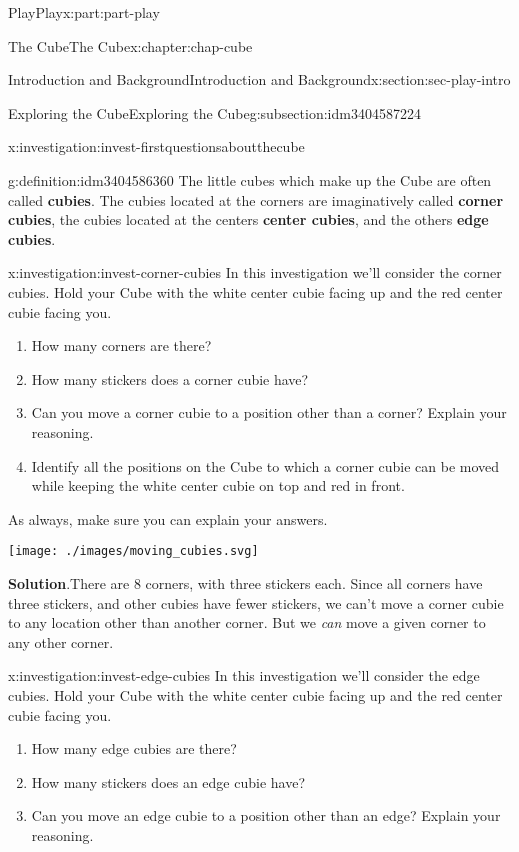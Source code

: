 \documentclass[oneside,10pt,]{book}
\newcommand{\blocktitlefont}{\relax}
\newcommand{\terminology}[1]{\textbf{#1}}
\numberwithin{equation}{section}
\begin{document}
\begin{partptx}{Play}{}{Play}{}{}{x:part:part-play}
\begin{chapterptx}{The Cube}{}{The Cube}{}{}{x:chapter:chap-cube}
\begin{sectionptx}{Introduction and Background}{}{Introduction and Background}{}{}{x:section:sec-play-intro}
\begin{subsectionptx}{Exploring the Cube}{}{Exploring the Cube}{}{}{g:subsection:idm3404587224}
\begin{investigation}{}{x:investigation:invest-firstquestionsaboutthecube}
\end{investigation}%
\begin{definition}{}{g:definition:idm3404586360}%
%
%
%
%
The little cubes which make up the Cube are often called \terminology{cubies}. The cubies located at the corners are imaginatively called \terminology{corner cubies}, the cubies located at the centers \terminology{center cubies}, and the others \terminology{edge cubies}.%
\end{definition}
\begin{investigation}{}{x:investigation:invest-corner-cubies}%
In this investigation we'll consider the corner cubies. Hold your Cube with the white center cubie facing up and the red center cubie facing you.%
\begin{enumerate}
\item{}How many corners are there?%
\item{}How many stickers does a corner cubie have?%
\item{}Can you move a corner cubie to a position other than a corner? Explain your reasoning.%
\item{}Identify all the positions on the Cube to which a corner cubie can be moved while keeping the white center cubie on top and red in front.%
\end{enumerate}
As always, make sure you can explain your answers.%
\begin{image}{0.25}{0.5}{0.25}%
\texttt{[image: ./images/moving\_cubies.svg]}
\end{image}%
\par\smallskip%
\noindent\textbf{\blocktitlefont Solution}.\hypertarget{g:solution:idm3404577592}{}\quad{}There are 8 corners, with three stickers each. Since all corners have three stickers, and other cubies have fewer stickers, we can't move a corner cubie to any location other than another corner. But we \emph{can} move a given corner to any other corner.\end{investigation}%
\begin{investigation}{}{x:investigation:invest-edge-cubies}%
In this investigation we'll consider the edge cubies. Hold your Cube with the white center cubie facing up and the red center cubie facing you.%
\begin{enumerate}
\item{}How many edge cubies are there?%
\item{}How many stickers does an edge cubie have?%
\item{}Can you move an edge cubie to a position other than an edge? Explain your reasoning.%

\end{enumerate}
\end{investigation}
\end{subsectionptx}
\end{sectionptx}
\end{chapterptx}
\end{partptx}
\end{document}
